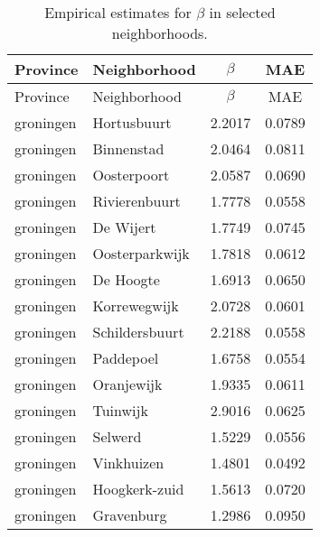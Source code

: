 \begin{longtable}{llcc}
\caption{Empirical estimates for $\beta$ in selected neighborhoods.} \label{tab:results} \\
	\hline
	Province      & Neighborhood            & $\beta$ & MAE                                  \\
	\hline
	\endfirsthead
	\hline
	Province      & Neighborhood            & $\beta$ & MAE                                  \\
	\hline
	\endhead
	groningen     & Hortusbuurt             & 2.2017  & 0.0789                               \\
	groningen     & Binnenstad              & 2.0464  & 0.0811                               \\
	groningen     & Oosterpoort             & 2.0587  & 0.0690                               \\
	groningen     & Rivierenbuurt           & 1.7778  & 0.0558                               \\
	groningen     & De Wijert               & 1.7749  & 0.0745                               \\
	groningen     & Oosterparkwijk          & 1.7818  & 0.0612                               \\
	groningen     & De Hoogte               & 1.6913  & 0.0650                               \\
	groningen     & Korrewegwijk            & 2.0728  & 0.0601                               \\
	groningen     & Schildersbuurt          & 2.2188  & 0.0558                               \\
	groningen     & Paddepoel               & 1.6758  & 0.0554                               \\
	groningen     & Oranjewijk              & 1.9335  & 0.0611                               \\
	groningen     & Tuinwijk                & 2.9016  & 0.0625                               \\
	groningen     & Selwerd                 & 1.5229  & 0.0556                               \\
	groningen     & Vinkhuizen              & 1.4801  & 0.0492                               \\
	groningen     & Hoogkerk-zuid           & 1.5613  & 0.0720                               \\
	groningen     & Gravenburg              & 1.2986  & 0.0950                               \\

\end{longtable}
